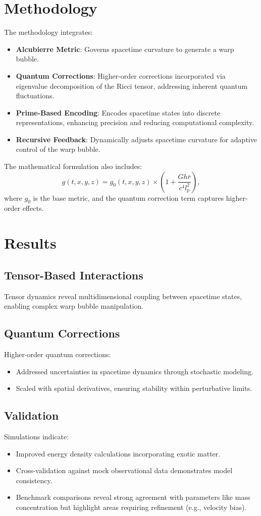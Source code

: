 \documentclass{article}
\theoremstyle{plain}
\begin{document}
\section{Methodology}
The methodology integrates:
\begin{itemize}
    \item \textbf{Alcubierre Metric}: Governs spacetime curvature to generate a warp bubble.
    \item \textbf{Quantum Corrections}: Higher-order corrections incorporated via eigenvalue decomposition of the Ricci tensor, addressing inherent quantum fluctuations.
    \item \textbf{Prime-Based Encoding}: Encodes spacetime states into discrete representations, enhancing precision and reducing computational complexity.
    \item \textbf{Recursive Feedback}: Dynamically adjusts spacetime curvature for adaptive control of the warp bubble.
\end{itemize}
The mathematical formulation also includes:
\begin{equation}
    g(t, x, y, z) = g_0(t, x, y, z) \times \left(1 + \frac{Gh\bar{r}}{c^4l_p^2}\right),
\end{equation}
where $g_0$ is the base metric, and the quantum correction term captures higher-order effects.

\section{Results}
\subsection{Tensor-Based Interactions}
Tensor dynamics reveal multidimensional coupling between spacetime states, enabling complex warp bubble manipulation.

\subsection{Quantum Corrections}
Higher-order quantum corrections:
\begin{itemize}
    \item Addressed uncertainties in spacetime dynamics through stochastic modeling.
    \item Scaled with spatial derivatives, ensuring stability within perturbative limits.
\end{itemize}

\subsection{Validation}
Simulations indicate:
\begin{itemize}
    \item Improved energy density calculations incorporating exotic matter.
    \item Cross-validation against mock observational data demonstrates model consistency.
    \item Benchmark comparisons reveal strong agreement with parameters like mass concentration but highlight areas requiring refinement (e.g., velocity bias).
\end{itemize}
\end{document}
